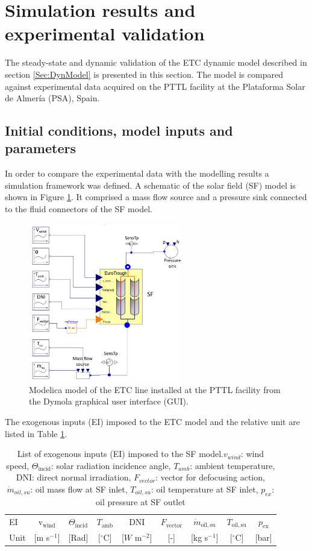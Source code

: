 \documentclass[final,3p,times,review]{elsarticle}
\begin{document}
\section{Simulation results and experimental validation}  \label{Sec:Validation}
%
The steady-state and dynamic validation of the ETC dynamic model described in section \ref{Sec:DynModel} is presented in this section. The model is compared against experimental data acquired on the PTTL facility at the Plataforma Solar de Almer\' ia (PSA), Spain. 
%
\subsection{Initial conditions, model inputs and parameters}
%
\label{subsec:SF_model}
In order to compare the  experimental data with the modelling results a simulation framework was defined. A schematic of the solar field (SF) model is shown in Figure \ref{fig:SF_ModModel}. It comprised a mass flow source and a pressure sink connected to the fluid connectors of the SF model. 
%
\begin{figure}[h!]
\centering
\includegraphics[width=0.6\textwidth]{Figures/Modelica_SF_v1crop.pdf}
\caption{Modelica model of the ETC line installed at the PTTL facility from the Dymola graphical user interface (GUI).}
\label{fig:SF_ModModel}
\end{figure}
%
The exogenous inputs (EI) imposed to the ETC model and the relative unit are listed in Table \ref{Tab:SF_Inputs}. 
%
\begin{table}[h!]
\centering
\caption{List of exogenous inputs (EI) imposed to the SF model.$v_{wind}$: wind speed, $\Theta_\mathrm{incid}$: solar radiation incidence angle, $T_{amb}$: ambient temperature, DNI: direct normal irradiation, $F_{vector}$: vector for defocusing action, $\dot{m}_{oil,su}$: oil mass flow at SF inlet,  $T_{oil,su}$: oil temperature at SF inlet, $p_{ex}$: oil pressure at SF outlet}
\begin{tabular}{lcccccccc}
\toprule
EI   & v$_\mathrm{wind}$   & $\Theta_\mathrm{incid}$ & $T_\mathrm{amb}$      & DNI                & $F_\mathrm{vector}$   & $\dot{m}_\mathrm{oil,su}$ & $T_\mathrm{oil,su}$   & $p_\mathrm{ex}$ \\
Unit & [m s$^{-1}$] & [Rad]    &  [$^{\circ}$C] &  [$W$ m$^{-2}$]      & [-]            &  [kg s$^{-1}$]     &  [$^{\circ}$C] &  [bar] \\
\bottomrule
\end{tabular}
\label{Tab:SF_Inputs}
\end{table}
\end{document}

